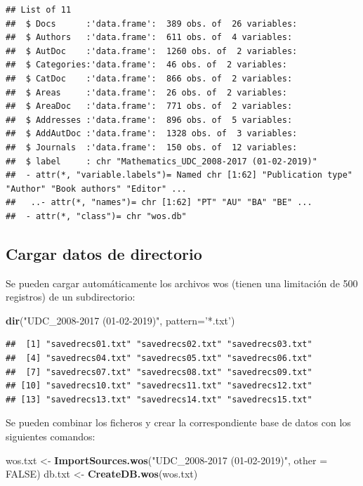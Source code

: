 \documentclass[]{book}
\newenvironment{Shaded}{\begin{snugshade}}{\end{snugshade}}
\newcommand{\KeywordTok}[1]{\textcolor[rgb]{0.13,0.29,0.53}{\textbf{#1}}}
\newcommand{\DataTypeTok}[1]{\textcolor[rgb]{0.13,0.29,0.53}{#1}}
\newcommand{\StringTok}[1]{\textcolor[rgb]{0.31,0.60,0.02}{#1}}
\newcommand{\OtherTok}[1]{\textcolor[rgb]{0.56,0.35,0.01}{#1}}
\newcommand{\NormalTok}[1]{#1}
\begin{document}
\begin{verbatim}
## List of 11
##  $ Docs      :'data.frame':  389 obs. of  26 variables:
##  $ Authors   :'data.frame':  611 obs. of  4 variables:
##  $ AutDoc    :'data.frame':  1260 obs. of  2 variables:
##  $ Categories:'data.frame':  46 obs. of  2 variables:
##  $ CatDoc    :'data.frame':  866 obs. of  2 variables:
##  $ Areas     :'data.frame':  26 obs. of  2 variables:
##  $ AreaDoc   :'data.frame':  771 obs. of  2 variables:
##  $ Addresses :'data.frame':  896 obs. of  5 variables:
##  $ AddAutDoc :'data.frame':  1328 obs. of  3 variables:
##  $ Journals  :'data.frame':  150 obs. of  12 variables:
##  $ label     : chr "Mathematics_UDC_2008-2017 (01-02-2019)"
##  - attr(*, "variable.labels")= Named chr [1:62] "Publication type" "Author" "Book authors" "Editor" ...
##   ..- attr(*, "names")= chr [1:62] "PT" "AU" "BA" "BE" ...
##  - attr(*, "class")= chr "wos.db"
\end{verbatim}

\subsection{Cargar datos de
directorio}\label{cargar-datos-de-directorio}

Se pueden cargar automáticamente los archivos wos (tienen una limitación
de 500 registros) de un subdirectorio:

\begin{Shaded}
\begin{Highlighting}[]
\KeywordTok{dir}\NormalTok{(}\StringTok{"UDC_2008-2017 (01-02-2019)"}\NormalTok{, }\DataTypeTok{pattern=}\StringTok{'*.txt'}\NormalTok{)}
\end{Highlighting}
\end{Shaded}

\begin{verbatim}
##  [1] "savedrecs01.txt" "savedrecs02.txt" "savedrecs03.txt"
##  [4] "savedrecs04.txt" "savedrecs05.txt" "savedrecs06.txt"
##  [7] "savedrecs07.txt" "savedrecs08.txt" "savedrecs09.txt"
## [10] "savedrecs10.txt" "savedrecs11.txt" "savedrecs12.txt"
## [13] "savedrecs13.txt" "savedrecs14.txt" "savedrecs15.txt"
\end{verbatim}

Se pueden combinar los ficheros y crear la correspondiente base de datos
con los siguientes comandos:

\begin{Shaded}
\begin{Highlighting}[]
\NormalTok{wos.txt <-}\StringTok{ }\KeywordTok{ImportSources.wos}\NormalTok{(}\StringTok{"UDC_2008-2017 (01-02-2019)"}\NormalTok{, }\DataTypeTok{other =} \OtherTok{FALSE}\NormalTok{)}
\NormalTok{db.txt <-}\StringTok{ }\KeywordTok{CreateDB.wos}\NormalTok{(wos.txt)}
\end{Highlighting}
\end{Shaded}
\end{document}

